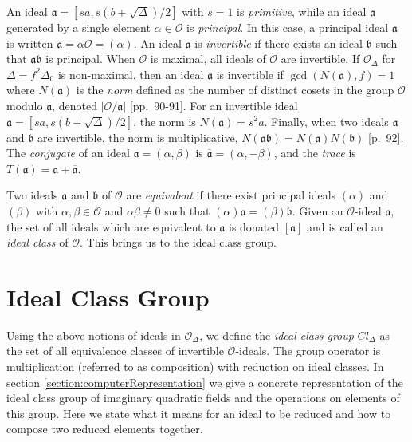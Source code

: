 \documentclass{ucalgthes1}
\theoremstyle{plain}
\theoremstyle{definition}
\newcommand{\OO}{\mathcal{O}}
\begin{document}
\noindent
An ideal $\mathfrak{a} = [sa, s(b+\sqrt{\Delta})/2]$ with $s=1$ is \emph{primitive}, while an ideal $\mathfrak{a}$ generated by a single element $\alpha \in \OO$ is \emph{principal}. In this case, a principal ideal $\mathfrak a$ is written $\mathfrak{a} = \alpha \OO = (\alpha)$.  An ideal $\mathfrak{a}$ is \emph{invertible} if there exists an ideal $\mathfrak{b}$ such that $\mathfrak{a}\mathfrak{b}$ is principal.  When $\OO$ is maximal, all ideals of $\OO$ are invertible.  If $\OO_\Delta$ for $\Delta = f^2\Delta_0$ is non-maximal, then an ideal $\mathfrak{a}$ is invertible if $\gcd(N(\mathfrak{a}),f)=1$ where $N(\mathfrak{a})$ is the \emph{norm} defined as the number of distinct cosets in the group $\OO$ modulo $\mathfrak{a}$, denoted $|\OO/\mathfrak{a}|$ \cite{Jac09}[pp.~90-91].  For an invertible ideal $\mathfrak{a} = [sa, s(b+\sqrt{\Delta})/2]$, the norm is $N(\mathfrak{a}) = s^2a$.  Finally, when two ideals $\mathfrak{a}$ and $\mathfrak{b}$ are invertible, the norm is multiplicative, $N(\mathfrak{a}\mathfrak{b}) = N(\mathfrak{a})N(\mathfrak{b})$ \cite{Jac09}[p.~92].  The \emph{conjugate} of an ideal $\mathfrak{a} = (\alpha, \beta)$ is $\overline{\mathfrak{a}} = (\alpha, -\beta)$, and the \emph{trace} is $T(\mathfrak a) = \mathfrak a + \overline{\mathfrak a}$.

Two ideals $\mathfrak{a}$ and $\mathfrak{b}$ of $\OO$ are \emph{equivalent} if there exist principal ideals $(\alpha)$ and $(\beta)$ with  $\alpha, \beta \in \OO$ and $\alpha\beta \neq 0$ such that $(\alpha)\mathfrak{a} = (\beta)\mathfrak{b}$.  Given an $\OO$-ideal $\mathfrak{a}$, the set of all ideals which are equivalent to $\mathfrak{a}$ is donated $[\mathfrak{a}]$ and is called an \emph{ideal class} of $\OO$.  This brings us to the ideal class group.


\bigbreak
\section{Ideal Class Group}

Using the above notions of ideals in $\OO_\Delta$, we define the \emph{ideal class group} $Cl_\Delta$ as the set of all equivalence classes of invertible $\OO$-ideals. The group operator is multiplication (referred to as composition) with reduction on ideal classes.  In section \ref{section:computerRepresentation} we give a concrete representation of the ideal class group of imaginary quadratic fields and the operations on elements of this group.  Here we state what it means for an ideal to be reduced and how to compose two reduced elements together.
\end{document}
